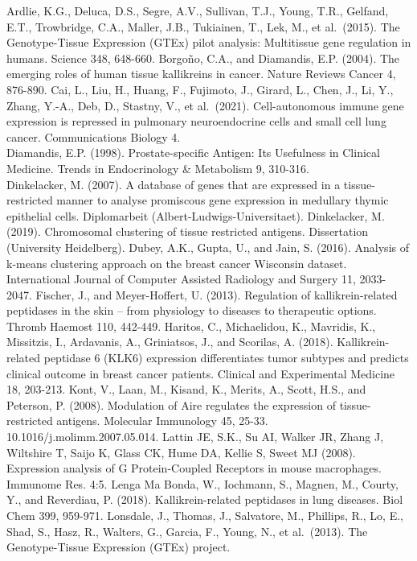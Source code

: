 \documentclass[
]{article}
\begin{document}
Ardlie, K.G., Deluca, D.S., Segre, A.V., Sullivan, T.J., Young, T.R.,
Gelfand, E.T., Trowbridge, C.A., Maller, J.B., Tukiainen, T., Lek, M.,
et al.~(2015). The Genotype-Tissue Expression (GTEx) pilot analysis:
Multitissue gene regulation in humans. Science 348, 648-660. Borgoño,
C.A., and Diamandis, E.P. (2004). The emerging roles of human tissue
kallikreins in cancer. Nature Reviews Cancer 4, 876-890. Cai, L., Liu,
H., Huang, F., Fujimoto, J., Girard, L., Chen, J., Li, Y., Zhang, Y.-A.,
Deb, D., Stastny, V., et al.~(2021). Cell-autonomous immune gene
expression is repressed in pulmonary neuroendocrine cells and small cell
lung cancer. Communications Biology 4.\\
Diamandis, E.P. (1998). Prostate-specific Antigen: Its Usefulness in
Clinical Medicine. Trends in Endocrinology \& Metabolism 9, 310-316.\\
Dinkelacker, M. (2007). A database of genes that are expressed in a
tissue-restricted manner to analyse promiscous gene expression in
medullary thymic epithelial cells. Diplomarbeit
(Albert-Ludwigs-Universitaet). Dinkelacker, M. (2019). Chromosomal
clustering of tissue restricted antigens. Dissertation (University
Heidelberg). Dubey, A.K., Gupta, U., and Jain, S. (2016). Analysis of
k-means clustering approach on the breast cancer Wisconsin dataset.
International Journal of Computer Assisted Radiology and Surgery 11,
2033-2047. Fischer, J., and Meyer-Hoffert, U. (2013). Regulation of
kallikrein-related peptidases in the skin -- from physiology to diseases
to therapeutic options. Thromb Haemost 110, 442-449. Haritos, C.,
Michaelidou, K., Mavridis, K., Missitzis, I., Ardavanis, A., Griniatsos,
J., and Scorilas, A. (2018). Kallikrein-related peptidase 6 (KLK6)
expression differentiates tumor subtypes and predicts clinical outcome
in breast cancer patients. Clinical and Experimental Medicine 18,
203-213. Kont, V., Laan, M., Kisand, K., Merits, A., Scott, H.S., and
Peterson, P. (2008). Modulation of Aire regulates the expression of
tissue-restricted antigens. Molecular Immunology 45, 25-33.
10.1016/j.molimm.2007.05.014. Lattin JE, S.K., Su AI, Walker JR, Zhang
J, Wiltshire T, Saijo K, Glass CK, Hume DA, Kellie S, Sweet MJ (2008).
Expression analysis of G Protein-Coupled Receptors in mouse macrophages.
Immunome Res. 4:5. Lenga Ma Bonda, W., Iochmann, S., Magnen, M., Courty,
Y., and Reverdiau, P. (2018). Kallikrein-related peptidases in lung
diseases. Biol Chem 399, 959-971. Lonsdale, J., Thomas, J., Salvatore,
M., Phillips, R., Lo, E., Shad, S., Hasz, R., Walters, G., Garcia, F.,
Young, N., et al.~(2013). The Genotype-Tissue Expression (GTEx) project.
\end{document}
